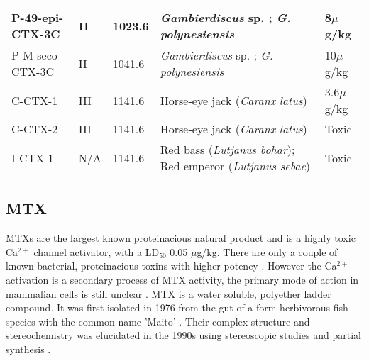 \documentclass[12pt]{article}
\begin{document}
\begin{table}
\begin{tabular}{  | p{2cm} | p{1.5cm} | p{2.5cm} | p{4cm} | p{4cm} |}
 \hline
 P-49-epi-CTX-3C & II & 1023.6 \cite{chinain2010growth} & \emph{Gambierdiscus} sp. \cite{satake1993structure}; \emph{G. polynesiensis} \cite{chinain2010growth} & 8$\mu$g/kg\cite{chinain2010growth}\\
 \hline
 P-M-seco-CTX-3C & II & 1041.6 \cite{chinain2010growth} &\emph{Gambierdiscus} sp. \cite{satake1993structure}; \emph{G. polynesiensis} \cite{chinain2010growth} & 10$\mu$g/kg \cite{chinain2010growth}\\
 \hline
 C-CTX-1 & III & 1141.6 \cite{vernoux1997isolation,pottier2002characterisation} & Horse-eye jack (\emph{Caranx latus}) \cite{vernoux1997isolation,pottier2002characterisation} & 3.6$\mu$g/kg \cite{vernoux1997isolation}\\
 \hline
 C-CTX-2 & III & 1141.6 \cite{vernoux1997isolation,pottier2002characterisation}& Horse-eye jack (\emph{Caranx latus}) \cite{vernoux1997isolation,pottier2002characterisation} & Toxic \cite{vernoux1997isolation}\\
 \hline
 I-CTX-1 & N/A & 1141.6 \cite{hamilton2002isolation}& Red bass (\emph{Lutjanus bohar}); Red emperor (\emph{Lutjanus sebae}) \cite{hamilton2002isolation} & Toxic \cite{hamilton2002isolation} \\
 \hline
\end{tabular}
\end{table}
\FloatBarrier

\subsection{MTX}

MTXs are the largest known proteinacious natural product \cite{yokoyama1988some,murata1993structure} and is a highly toxic Ca$^{2+}$ channel activator, with a LD$_{50}$ 0.05 $\mu$g/kg. There are only a couple of known bacterial, proteinacious toxins with higher potency \cite{yokoyama1988some,murata1993structure}. However the Ca$^{2+}$ activation is a secondary process of MTX activity, the primary mode of action in mammalian cells  is still unclear \cite{van2000diversity}. MTX is a water soluble, polyether ladder compound. It was first isolated in 1976 from the gut of a form herbivorous fish species with the common name 'Maito' \cite{yasumoto1976toxicity}. Their complex structure and stereochemistry was elucidated in the 1990s using stereoscopic studies and partial synthesis \cite{murata1993structure,murata1994structure,satake1995structural,nonomura1996complete,zheng1996complete}. \\
\end{document}
